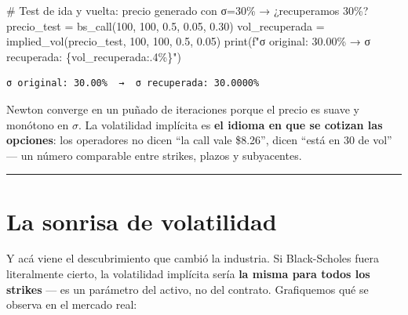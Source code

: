 \documentclass[
  spanish,
  letterpaper,
  DIV=11,
  numbers=noendperiod]{scrreprt}
\newenvironment{Shaded}{\begin{snugshade}}{\end{snugshade}}
\newcommand{\BuiltInTok}[1]{\textcolor[rgb]{0.00,0.23,0.31}{#1}}
\newcommand{\CommentTok}[1]{\textcolor[rgb]{0.37,0.37,0.37}{#1}}
\newcommand{\DecValTok}[1]{\textcolor[rgb]{0.68,0.00,0.00}{#1}}
\newcommand{\FloatTok}[1]{\textcolor[rgb]{0.68,0.00,0.00}{#1}}
\newcommand{\NormalTok}[1]{\textcolor[rgb]{0.00,0.23,0.31}{#1}}
\newcommand{\OperatorTok}[1]{\textcolor[rgb]{0.37,0.37,0.37}{#1}}
\newcommand{\SpecialCharTok}[1]{\textcolor[rgb]{0.37,0.37,0.37}{#1}}
\newcommand{\SpecialStringTok}[1]{\textcolor[rgb]{0.13,0.47,0.30}{#1}}
\begin{document}
\begin{Shaded}
\begin{Highlighting}[]
\CommentTok{\# Test de ida y vuelta: precio generado con σ=30\% → ¿recuperamos 30\%?}
\NormalTok{precio\_test }\OperatorTok{=}\NormalTok{ bs\_call(}\DecValTok{100}\NormalTok{, }\DecValTok{100}\NormalTok{, }\FloatTok{0.5}\NormalTok{, }\FloatTok{0.05}\NormalTok{, }\FloatTok{0.30}\NormalTok{)}
\NormalTok{vol\_recuperada }\OperatorTok{=}\NormalTok{ implied\_vol(precio\_test, }\DecValTok{100}\NormalTok{, }\DecValTok{100}\NormalTok{, }\FloatTok{0.5}\NormalTok{, }\FloatTok{0.05}\NormalTok{)}
\BuiltInTok{print}\NormalTok{(}\SpecialStringTok{f"σ original: 30.00\%  →  σ recuperada: }\SpecialCharTok{\{}\NormalTok{vol\_recuperada}\SpecialCharTok{:.4\%\}}\SpecialStringTok{"}\NormalTok{)}
\end{Highlighting}
\end{Shaded}

\begin{verbatim}
σ original: 30.00%  →  σ recuperada: 30.0000%
\end{verbatim}

Newton converge en un puñado de iteraciones porque el precio es suave y
monótono en \(\sigma\). La volatilidad implícita es \textbf{el idioma en
que se cotizan las opciones}: los operadores no dicen ``la call vale
\$8.26'', dicen ``está en 30 de vol'' --- un número comparable entre
strikes, plazos y subyacentes.

\begin{center}\rule{0.5\linewidth}{0.5pt}\end{center}

\chapter{La sonrisa de volatilidad}\label{la-sonrisa-de-volatilidad}

Y acá viene el descubrimiento que cambió la industria. Si Black-Scholes
fuera literalmente cierto, la volatilidad implícita sería \textbf{la
misma para todos los strikes} --- es un parámetro del activo, no del
contrato. Grafiquemos qué se observa en el mercado real:
\end{document}
